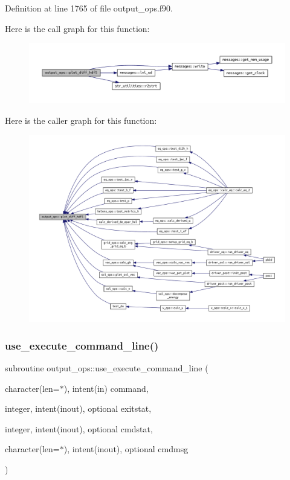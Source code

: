 Definition at line 1765 of file output\+\_\+ops.\+f90.

Here is the call graph for this function\+:\nopagebreak
\begin{figure}[H]
\begin{center}
\leavevmode
\includegraphics[width=350pt]{namespaceoutput__ops_ab0d14194d01ab0534562eab50b37a57a_cgraph}
\end{center}
\end{figure}
Here is the caller graph for this function\+:
\nopagebreak
\begin{figure}[H]
\begin{center}
\leavevmode
\includegraphics[width=350pt]{namespaceoutput__ops_ab0d14194d01ab0534562eab50b37a57a_icgraph}
\end{center}
\end{figure}
\mbox{\label{namespaceoutput__ops_aa9e4855511b6ea16a08b3efb587bec51}} 
\subsubsection{\texorpdfstring{use\+\_\+execute\+\_\+command\+\_\+line()}{use\_execute\_command\_line()}}
{\footnotesize\ttfamily subroutine output\+\_\+ops\+::use\+\_\+execute\+\_\+command\+\_\+line (\begin{DoxyParamCaption}\item[{character(len=$\ast$), intent(in)}]{command,  }\item[{integer, intent(inout), optional}]{exitstat,  }\item[{integer, intent(inout), optional}]{cmdstat,  }\item[{character(len=$\ast$), intent(inout), optional}]{cmdmsg }\end{DoxyParamCaption})}



